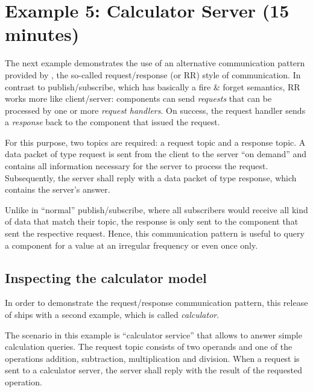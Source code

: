 %
% 
%
%
%

\section{Example 5: Calculator Server (15 minutes)}
\label{sec:example_calculator}

The next example demonstrates the use of an alternative communication pattern provided by \xme,
the so-called request/response (or RR) style of communication.
In contrast to publish/subscribe, which has basically a fire \& forget semantics,
RR works more like client/server:
components can send \emph{requests} that can be processed by one or more \emph{request handlers}.
On success, the request handler sends a \emph{response} back to the component that issued the request.

For this purpose, two topics are required: a request topic and a response topic.
A data packet of type request is sent from the client to the server ``on demand''
and contains all information necessary for the server to process the request.
Subsequently, the server shall reply with a data packet of type response, which contains the server's answer.

Unlike in ``normal'' publish/subscribe, where all subscribers would receive all kind of data that match their topic,
the response is only sent to the component that sent the respective request.
Hence, this communication pattern is useful to query a component for a value at an irregular frequency or even once only.

\subsection{Inspecting the calculator model}

In order to demonstrate the request/response communication pattern,
this release of \xme ships with a second example, which is called \emph{calculator}.

The scenario in this example is ``calculator service'' that allows to answer simple calculation queries.
The request topic consists of two operands and one of the operations addition, subtraction, multiplication and division.
When a request is sent to a calculator server, the server shall reply with the result of the requested operation.

